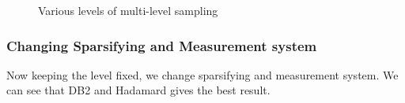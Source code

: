 \documentclass{article}
\begin{document}
\begin{figure}[ht]
 \centering    
 \hfill
 \hfill
 \hfill
 \caption{Various levels of multi-level sampling}
\end{figure}


\subsubsection{Changing Sparsifying and Measurement system}

Now keeping the level fixed, we change sparsifying and measurement system. We can see that DB2 and Hadamard gives the best result. 
\end{document}
